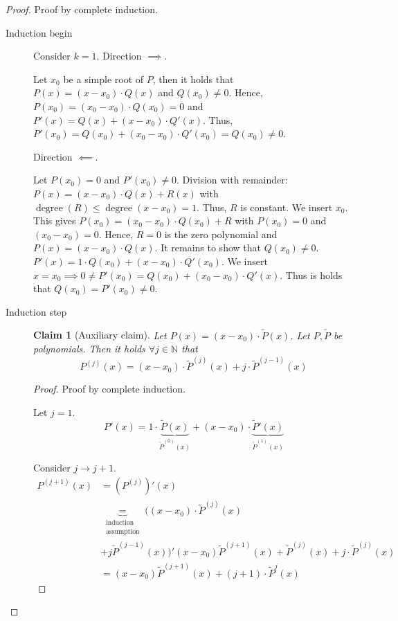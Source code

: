 \documentclass{article}
\newtheorem*{claim}{Claim}%
\begin{document}
\begin{proof}
  Proof by complete induction.

  \begin{description}
    \item[Induction begin]
      Consider $k=1$. Direction $\implies$.

      Let $x_0$ be a simple root of $P$, then it holds that $P(x) = (x - x_0) \cdot Q(x)$ and $Q(x_0) \neq 0$.
      Hence, $P(x_0) = (x_0 - x_0) \cdot Q(x_0) = 0$ and $P'(x) = Q(x) + (x - x_0) \cdot Q'(x)$.
      Thus, $P'(x_0) = Q(x_0) + (x_0 - x_0) \cdot Q'(x_0) = Q(x_0) \neq 0$.

      Direction $\impliedby$.

      Let $P(x_0) = 0$ and $P'(x_0) \neq 0$. Division with remainder: $P(x) = (x - x_0) \cdot Q(x) + R(x)$
      with $\operatorname{degree}(R) \leq \operatorname{degree}(x - x_0) = 1$. Thus, $R$ is constant.
      We insert $x_0$. This gives $P(x_0) = (x_0 - x_0) \cdot Q(x_0) + R$ with $P(x_0) = 0$ and $(x_0 - x_0) = 0$.
      Hence, $R = 0$ is the zero polynomial and $P(x) = (x - x_0) \cdot Q(x)$.
      It remains to show that $Q(x_0) \neq 0$. $P'(x) = 1\cdot Q(x_0) + (x - x_0) \cdot Q'(x_0)$.
      We insert $x = x_0 \implies 0 \neq P'(x_0) = Q(x_0) + (x_0 - x_0) \cdot Q'(x)$.
      Thus is holds that $Q(x_0) = P'(x_0) \neq 0$.
    \item[Induction step]
      \begin{claim}[Auxiliary claim]
        Let $P(x) = (x - x_0) \cdot \tilde P(x)$.
        Let $P, \tilde P$ be polynomials. Then it holds $\forall j \in \mathbb N$ that
        \[ P^{(j)}(x) = (x - x_0) \cdot \tilde P^{(j)}(x) + j \cdot \tilde P^{(j-1)}(x) \]
      \end{claim}
      \begin{proof}
        Proof by complete induction.

        Let $j = 1$.
        \[ P'(x) = 1 \cdot \underbrace{\tilde P(x)}_{\tilde P^{(0)}(x)} + (x - x_0) \cdot \underbrace{\tilde P'(x)}_{\tilde P^{(1)}(x)} \]

        Consider $j \to j + 1$.
        \begin{align*}
          P^{(j+1)}(x) &= \left(P^{(j)}\right)'(x) \\
          &\underbrace{=}_{\substack{\text{induction} \\ \text{assumption}}} ((x - x_0) \cdot \tilde P^{(j)}(x) \\
          &+ j \tilde P^{(j-1)}(x))' (x - x_0) \tilde P^{(j+1)}(x) + \tilde P^{(j)}(x) + j \cdot \tilde P^{(j)}(x) \\
          &= (x - x_0) \tilde P^{(j+1)}(x) + (j + 1) \cdot \tilde P^{j}(x)
        \end{align*}
      \end{proof}


\end{description}
\end{proof}
\end{document}
